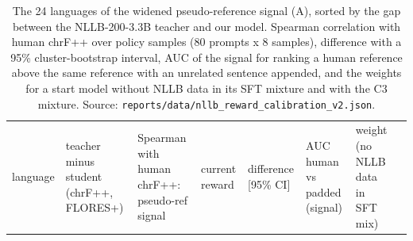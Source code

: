 \begin{table}[t]
\centering
\footnotesize
\setlength{\tabcolsep}{3pt}
\caption{The 24 languages of the widened pseudo-reference signal (A), sorted by the gap between the NLLB-200-3.3B teacher and our model. Spearman correlation with human chrF++ over policy samples (80 prompts x 8 samples), difference with a 95\% cluster-bootstrap interval, AUC of the signal for ranking a human reference above the same reference with an unrelated sentence appended, and the weights for a start model without NLLB data in its SFT mixture and with the C3 mixture. Source: \texttt{reports/data/nllb\_reward\_calibration\_v2.json}.}
\label{tab:t_nllb_widen}
{\def\LTcaptype{none} %
\begin{tabular}{@{}
  >{\raggedright\arraybackslash}p{}
  >{\raggedleft\arraybackslash}p{}
  >{\raggedleft\arraybackslash}p{}
  >{\raggedleft\arraybackslash}p{}
  >{\raggedleft\arraybackslash}p{}
  >{\raggedleft\arraybackslash}p{}
  >{\raggedleft\arraybackslash}p{}
  >{\raggedleft\arraybackslash}p{}@{}}
\toprule
\begin{minipage}[b]{\linewidth}\raggedright
language
\end{minipage} & \begin{minipage}[b]{\linewidth}\raggedleft
teacher minus student (chrF++, FLORES+)
\end{minipage} & \begin{minipage}[b]{\linewidth}\raggedleft
Spearman with human chrF++: pseudo-ref signal
\end{minipage} & \begin{minipage}[b]{\linewidth}\raggedleft
current reward
\end{minipage} & \begin{minipage}[b]{\linewidth}\raggedleft
difference {[}95\% CI{]}
\end{minipage} & \begin{minipage}[b]{\linewidth}\raggedleft
AUC human vs padded (signal)
\end{minipage} & \begin{minipage}[b]{\linewidth}\raggedleft
weight (no NLLB data in SFT mix)
\end{minipage} & \begin{minipage}[b]{\linewidth}\raggedleft

\end{minipage}
\end{tabular}}
\end{table}
